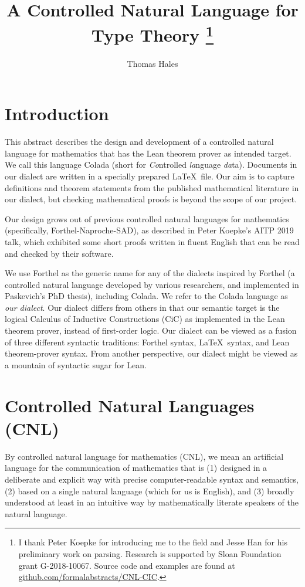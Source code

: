 \documentclass{easychair}
\title{A Controlled Natural Language for Type Theory%
\thanks{I thank Peter Koepke for introducing me to the field and Jesse Han for his
preliminary work on parsing.  
Research is supported by Sloan Foundation grant G-2018-10067.
Source code and examples are found at \url{github.com/formalabstracts/CNL-CIC}.}
}
\author{Thomas Hales}
\institute{
University of Pittsburgh\\
Pittsburgh, PA, USA
}
\renewcommand{\~}{\ }
\renewcommand{\_}{\textunderscore}
\begin{document}
\maketitle

\section{Introduction}

This abstract describes the design and development of a
controlled natural language for mathematics that has the Lean 
theorem prover as intended target.  We call this language Colada (short for
\emph{Co}ntrolled \emph{la}nguage \emph{da}ta).
Documents in our dialect are written in a specially prepared \LaTeX\ file.
Our aim is to capture definitions and theorem statements from the published
mathematical literature in our dialect, but 
checking mathematical proofs is beyond the scope of our project.



Our design grows out of previous controlled natural
languages for mathematics (specifically, Forthel-Naproche-SAD), as
described in Peter Koepke's AITP 2019 talk, which 
exhibited some short proofs written in fluent English that can be read and checked by their software. 

We use
Forthel as the generic name for any of
the dialects inspired by Forthel (a 
controlled natural language developed by various researchers, and implemented in Paskevich's PhD thesis), 
including Colada. 
We refer to the Colada language as
\emph{our dialect}.
Our dialect differs from others in that our semantic target is the logical Calculus of Inductive
Constructions (CiC) as implemented in the Lean theorem prover, 
instead of first-order logic.  
Our dialect can be viewed as a fusion of three different syntactic traditions:
Forthel syntax, \LaTeX\ syntax, and Lean theorem-prover
syntax.  
From another perspective, our dialect might be viewed as a  
mountain of syntactic sugar for Lean.




\section{Controlled Natural Languages (CNL)}\label{sub:CNL}

By controlled natural language for mathematics (CNL), we mean an
artificial language for the communication of mathematics that is (1)
designed in a deliberate and explicit way with precise
computer-readable syntax and semantics, (2) based on a single natural
language (which for us is  English), and (3) broadly
understood at least in an intuitive way by mathematically literate
speakers of the natural language.
\end{document}
